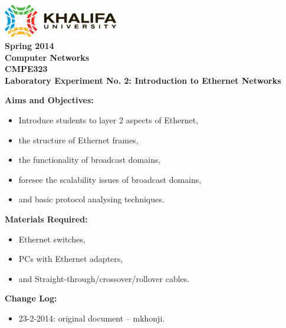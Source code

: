\documentclass[pdftex,12pt,a4paper]{article}
\begin{document}
    \begin{titlepage}
        \begin{center}
            \includegraphics[width=5cm]{figures/kulogo}\\[1cm]
            {\Large \bfseries
                Spring 2014\\
                Computer Networks\\
                CMPE323\\[1cm]
            }
            {\large \bfseries
                \noindent Laboratory Experiment No. 2: Introduction to Ethernet
                Networks\\[1cm]
            }
        \end{center}

        \noindent \textbf{Aims and Objectives:}
            \begin{itemize}[leftmargin=4cm]
                \item Introduce students to layer 2 aspects of Ethernet,
                \item the structure of Ethernet frames,
                \item the functionality of broadcast domains,
                \item foresee the scalability issues of broadcast domains,
                \item and basic protocol analysing techniques.
            \end{itemize}
            \vspace{0.5cm}

        \noindent \textbf{Materials Required:}
            \begin{itemize}[leftmargin=4cm]
                \item Ethernet switches,
                \item PCs with Ethernet adapters,
                \item and Straight-through/crossover/rollover cables.
            \end{itemize}
            \vspace{0.5cm}

        \noindent \textbf{Change Log:}
            \begin{itemize}[leftmargin=4cm]
                \item 23-2-2014: original document -- mkhonji.
            \end{itemize}
    \end{titlepage}
    \newpage
\end{document}
